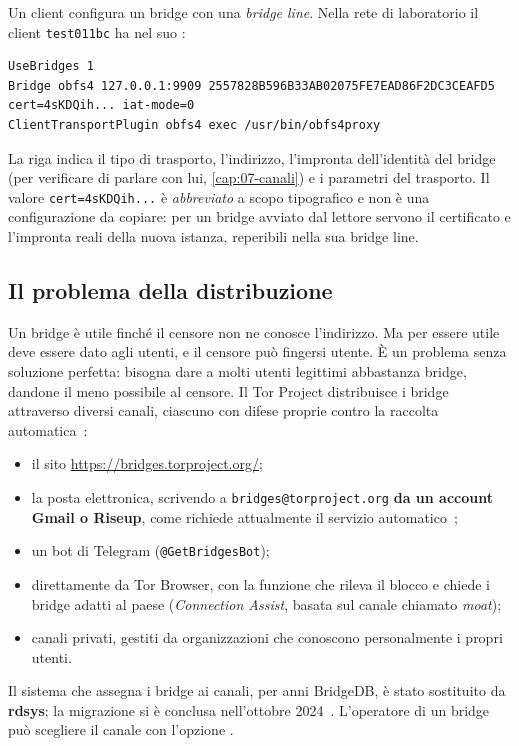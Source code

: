 Un client configura un bridge con una \emph{bridge line}. Nella rete di laboratorio il client \texttt{test011bc} ha nel suo :
\begin{lstlisting}[language=torrc,numbers=none]
UseBridges 1
Bridge obfs4 127.0.0.1:9909 2557828B596B33AB02075FE7EAD86F2DC3CEAFD5 cert=4sKDQih... iat-mode=0
ClientTransportPlugin obfs4 exec /usr/bin/obfs4proxy
\end{lstlisting}
La riga indica il tipo di trasporto, l'indirizzo, l'impronta dell'identità del bridge (per verificare di parlare con lui, \cref{cap:07-canali}) e i parametri del trasporto. Il valore \texttt{cert=4sKDQih...} è \emph{abbreviato} a scopo tipografico e non è una configurazione da copiare: per un bridge avviato dal lettore servono il certificato e l'impronta reali della nuova istanza, reperibili nella sua bridge line.

\subsection{Il problema della distribuzione}

Un bridge è utile finché il censore non ne conosce l'indirizzo. Ma per essere utile deve essere dato agli utenti, e il censore può fingersi utente. È un problema senza soluzione perfetta: bisogna dare a molti utenti legittimi abbastanza bridge, dandone il meno possibile al censore. Il Tor Project distribuisce i bridge attraverso diversi canali, ciascuno con difese proprie contro la raccolta automatica~\cite{torsupport}:
\begin{itemize}
  \item il sito \url{https://bridges.torproject.org/};
  \item la posta elettronica, scrivendo a \texttt{bridges@torproject.org} \textbf{da un account Gmail o Riseup}, come richiede attualmente il servizio automatico~\cite{torsupport};
  \item un bot di Telegram (\texttt{@GetBridgesBot});
  \item direttamente da Tor Browser, con la funzione che rileva il blocco e chiede i bridge adatti al paese (\emph{Connection Assist}, basata sul canale chiamato \emph{moat});
  \item canali privati, gestiti da organizzazioni che conoscono personalmente i propri utenti.
\end{itemize}
Il sistema che assegna i bridge ai canali, per anni BridgeDB, è stato sostituito da \textbf{rdsys}; la migrazione si è conclusa nell'ottobre 2024~\cite{torblogrdsys}. L'operatore di un bridge può scegliere il canale con l'opzione .

